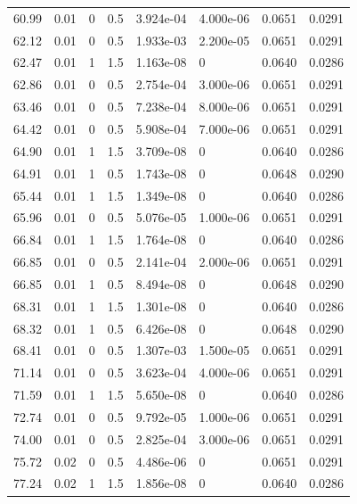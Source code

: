 \documentclass[preview]{standalone}
\begin{document}
{{{\begin{tabular}{L{1.2cm}C{1.2cm} C{0.3cm}C{0.5cm} C{1.4cm}C{1.4cm} C{1.4cm}C{1.4cm}}
  60.99  &  0.01  & 0     & 0.5 &  3.924e-04  & 4.000e-06  & 0.0651 &  0.0291   \\ 
  62.12  &  0.01  & 0     & 0.5 &  1.933e-03  & 2.200e-05  & 0.0651 &  0.0291   \\ 
  62.47  &  0.01  & 1     & 1.5 &  1.163e-08  & 0  & 0.0640 &  0.0286   \\ 
  62.86  &  0.01  & 0     & 0.5 &  2.754e-04  & 3.000e-06  & 0.0651 &  0.0291   \\ 
  63.46  &  0.01  & 0     & 0.5 &  7.238e-04  & 8.000e-06  & 0.0651 &  0.0291   \\ 
  64.42  &  0.01  & 0     & 0.5 &  5.908e-04  & 7.000e-06  & 0.0651 &  0.0291   \\ 
  64.90  &  0.01  & 1     & 1.5 &  3.709e-08  & 0  & 0.0640 &  0.0286   \\ 
  64.91  &  0.01  & 1     & 0.5 &  1.743e-08  & 0  & 0.0648 &  0.0290   \\ 
  65.44  &  0.01  & 1     & 1.5 &  1.349e-08  & 0  & 0.0640 &  0.0286   \\ 
  65.96  &  0.01  & 0     & 0.5 &  5.076e-05  & 1.000e-06  & 0.0651 &  0.0291   \\ 
  66.84  &  0.01  & 1     & 1.5 &  1.764e-08  & 0  & 0.0640 &  0.0286   \\ 
  66.85  &  0.01  & 0     & 0.5 &  2.141e-04  & 2.000e-06  & 0.0651 &  0.0291   \\ 
  66.85  &  0.01  & 1     & 0.5 &  8.494e-08  & 0  & 0.0648 &  0.0290   \\ 
  68.31  &  0.01  & 1     & 1.5 &  1.301e-08  & 0  & 0.0640 &  0.0286   \\ 
  68.32  &  0.01  & 1     & 0.5 &  6.426e-08  & 0  & 0.0648 &  0.0290   \\ 
  68.41  &  0.01  & 0     & 0.5 &  1.307e-03  & 1.500e-05  & 0.0651 &  0.0291   \\ 
  71.14  &  0.01  & 0     & 0.5 &  3.623e-04  & 4.000e-06  & 0.0651 &  0.0291   \\ 
  71.59  &  0.01  & 1     & 1.5 &  5.650e-08  & 0  & 0.0640 &  0.0286   \\ 
  72.74  &  0.01  & 0     & 0.5 &  9.792e-05  & 1.000e-06  & 0.0651 &  0.0291   \\ 
  74.00  &  0.01  & 0     & 0.5 &  2.825e-04  & 3.000e-06  & 0.0651 &  0.0291   \\ 
  75.72  &  0.02  & 0     & 0.5 &  4.486e-06  & 0  & 0.0651 &  0.0291   \\ 
  77.24  &  0.02  & 1     & 1.5 &  1.856e-08  & 0  & 0.0640 &  0.0286   \\ 

\end{tabular}}}}
\end{document}
